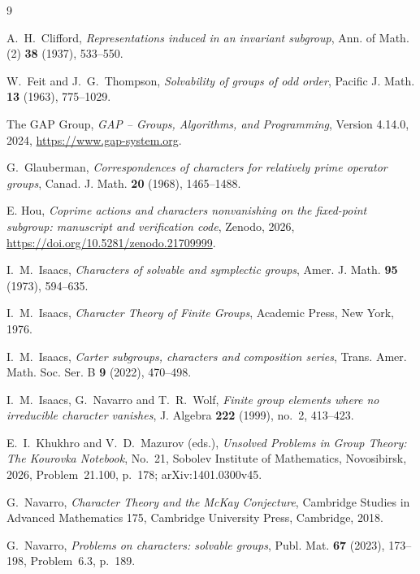 \documentclass[11pt,a4paper,reqno]{amsart}
\theoremstyle{definition}
\theoremstyle{remark}
\begin{document}
\begin{thebibliography}{9}

A.~H.~Clifford,
\emph{Representations induced in an invariant subgroup},
Ann. of Math. (2) \textbf{38} (1937), 533--550.

W.~Feit and J.~G.~Thompson,
\emph{Solvability of groups of odd order},
Pacific J. Math. \textbf{13} (1963), 775--1029.

The GAP Group,
\emph{GAP -- Groups, Algorithms, and Programming}, Version 4.14.0, 2024,
\url{https://www.gap-system.org}.

G.~Glauberman,
\emph{Correspondences of characters for relatively prime operator
groups},
Canad. J. Math. \textbf{20} (1968), 1465--1488.

E. Hou, \emph{Coprime actions and characters nonvanishing on the
fixed-point subgroup: manuscript and verification code}, Zenodo, 2026,
\url{https://doi.org/10.5281/zenodo.21709999}.

I.~M.~Isaacs,
\emph{Characters of solvable and symplectic groups},
Amer. J. Math. \textbf{95} (1973), 594--635.

I.~M.~Isaacs,
\emph{Character Theory of Finite Groups},
Academic Press, New York, 1976.

I.~M.~Isaacs,
\emph{Carter subgroups, characters and composition series},
Trans. Amer. Math. Soc. Ser. B \textbf{9} (2022), 470--498.

I.~M.~Isaacs, G.~Navarro and T.~R.~Wolf,
\emph{Finite group elements where no irreducible character vanishes},
J. Algebra \textbf{222} (1999), no.~2, 413--423.

E.~I.~Khukhro and V.~D.~Mazurov (eds.),
\emph{Unsolved Problems in Group Theory: The Kourovka Notebook},
No.~21, Sobolev Institute of Mathematics, Novosibirsk, 2026,
Problem~21.100, p.~178; arXiv:1401.0300v45.

G.~Navarro,
\emph{Character Theory and the McKay Conjecture},
Cambridge Studies in Advanced Mathematics 175,
Cambridge University Press, Cambridge, 2018.

G.~Navarro,
\emph{Problems on characters: solvable groups},
Publ. Mat. \textbf{67} (2023), 173--198,
Problem~6.3, p.~189.

\end{thebibliography}
\end{document}
